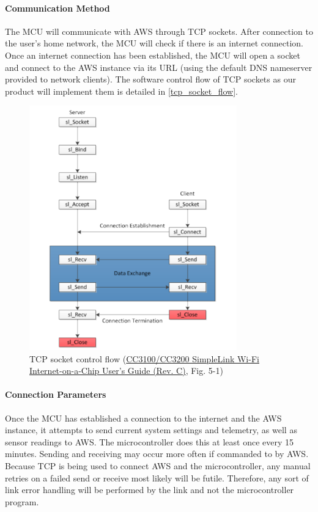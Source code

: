 \paragraph{Communication Method}
The MCU will communicate with AWS through TCP sockets. After connection to
the user's home network, the MCU will check if there is an internet
connection. Once an internet connection has been established, the MCU will
open a socket and connect to the AWS instance via its URL (using the
default DNS nameserver provided to network clients). The software control
flow of TCP sockets as our product will implement them is detailed in
\autoref{tcp_socket_flow}.
\begin{figure}[H]
    \caption{TCP socket control flow (\href{https://www.ti.com/lit/ug/swru368c/swru368c.pdf}{CC3100/CC3200 SimpleLink Wi-Fi Internet-on-a-Chip User's Guide (Rev. C)}, Fig. 5-1)}
    \label{tcp_socket_flow}
    \centering
    \includegraphics[width=0.8\textwidth]{images/tcp_socket_flow.png}
\end{figure}

\paragraph{Connection Parameters}
Once the MCU has established a connection to the internet and the AWS
instance, it attempts to send current system settings and telemetry, as
well as sensor readings to AWS. The microcontroller does this at least
once every 15 minutes. Sending and receiving may occur more often if
commanded to by AWS. Because TCP is being used to connect AWS and the
microcontroller, any manual retries on a failed send or receive most
likely will be futile. Therefore, any sort of link error handling will
be performed by the link and not the microcontroller program.

